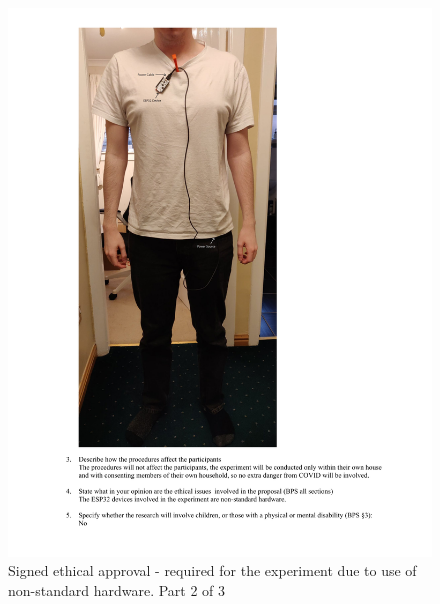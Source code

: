 \documentclass{l4proj}
\begin{document}
\begin{appendices}
    \begin{figure}[!htb]
        \centering
        \includegraphics[width=1.0\linewidth]{images/2306841w-ethics-approval 2.pdf}

        \caption{ Signed ethical approval - required for the experiment due to use of non-standard hardware. Part 2 of 3 }

        \label{fig:full_ethics_approval2}
    \end{figure}


\end{appendices}
\end{document}
